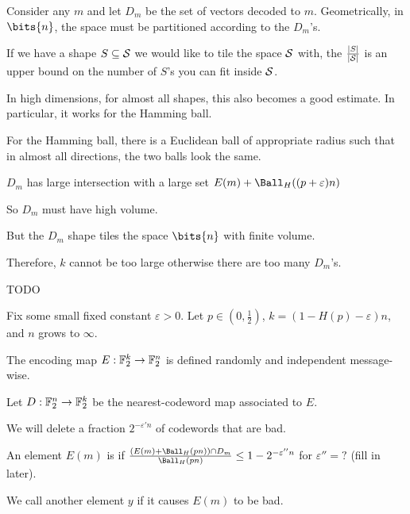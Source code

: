\documentclass[class=co432,notes,tikz]{agony}
\begin{document}
Consider any $m$ and let $D_m$ be the set of vectors decoded to $m$.
Geometrically, in $\bits{n}$, the space must be partitioned according to the $D_m$'s.

\begin{remark}
  If we have a shape $S \subseteq \mathcal S$ we would like to tile the space $\mathcal S$ with,
  the  $\frac{\abs{S}}{\abs{\mathcal S}}$ is an upper bound
  on the number of $S$'s you can fit inside $\mathcal S$.
\end{remark}

In high dimensions, for almost all shapes, this also becomes a good estimate.
In particular, it works for the Hamming ball.

\begin{remark}
  For the Hamming ball, there is a Euclidean ball of appropriate radius
  such that in almost all directions, the two balls look the same.
\end{remark}

\begin{prf}
  $D_m$ has large intersection with a large set $E(m) + \Ball_H((p+\varepsilon)n)$

  So $D_m$ must have high volume.

  But the $D_m$ shape tiles the space $\bits{n}$ with finite volume.

  Therefore, $k$ cannot be too large otherwise there are too many $D_m$'s.
\end{prf}


TODO


\begin{defn}
  Fix some small fixed constant $\varepsilon > 0$.
  Let $p \in (0,\frac12)$, $k = (1-H(p)-\varepsilon)n$, and $n$ grows to $\infty$.

  The encoding map $E : \mathbb{F}_2^k \to \mathbb{F}_2^n$ is defined randomly and independent message-wise.

  Let $D : \mathbb{F}_2^n \to \mathbb{F}_2^k$ be the nearest-codeword map associated to $E$.
\end{defn}

We will delete a fraction $2^{-\varepsilon'n}$ of codewords that are bad.

\begin{defn}
  An element $E(m)$ is  if
  $\frac{(E(m) + \Ball_H(pn)) \cap D_m}{\Ball_H(pn)} \leq 1-2^{-\varepsilon''n}$
  for $\varepsilon'' = ?$ (fill in later).

  We call another element $y$  if it causes $E(m)$ to be bad.
\end{defn}
\end{document}
